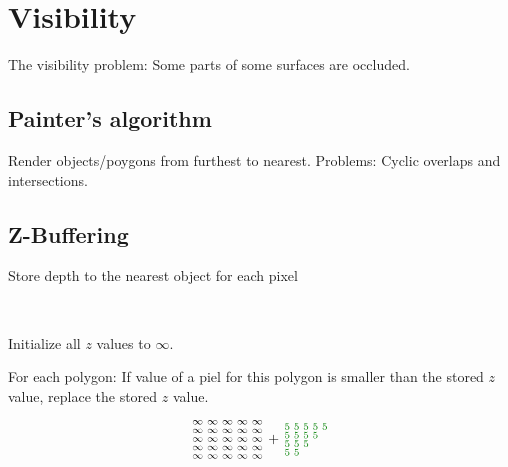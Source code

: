 \chapter{Visibility}
The visibility problem: Some parts of some surfaces are occluded.
\section{Painter's algorithm}
Render objects/poygons from furthest to nearest. Problems: Cyclic overlaps and intersections.
\section{Z-Buffering}
Store depth to the nearest object for each pixel
\begin{compactdesc}
\item[\lp{Algorithm}] \hfill\\
	\begin{enumerate*}[label=\protect\circled{\arabic*},itemjoin=]
		\item Initialize all $z$ values to $\infty$.\\
		\item For each polygon: If value of a piel for this polygon is smaller than the stored $z$ value, replace the stored $z$ value.
	\end{enumerate*}
			\begin{gather*}
				\begin{smallmatrix}
					\infty&\infty&\infty&\infty&\infty\\
					\infty&\infty&\infty&\infty&\infty\\
					\infty&\infty&\infty&\infty&\infty\\
					\infty&\infty&\infty&\infty&\infty\\
					\infty&\infty&\infty&\infty&\infty
				\end{smallmatrix}
				+
				\begin{smallmatrix}
					\textcolor{black!50!green}{5}&\textcolor{black!50!green}{5}&\textcolor{black!50!green}{5}&\textcolor{black!50!green}{5}&\textcolor{black!50!green}{5}\\
					\textcolor{black!50!green}{5}&\textcolor{black!50!green}{5}&\textcolor{black!50!green}{5}&\textcolor{black!50!green}{5}&\\
					\textcolor{black!50!green}{5}&\textcolor{black!50!green}{5}&\textcolor{black!50!green}{5}&&\\
					\textcolor{black!50!green}{5}&\textcolor{black!50!green}{5}&&&\\

\end{smallmatrix}
\end{gather*}
\end{compactdesc}
